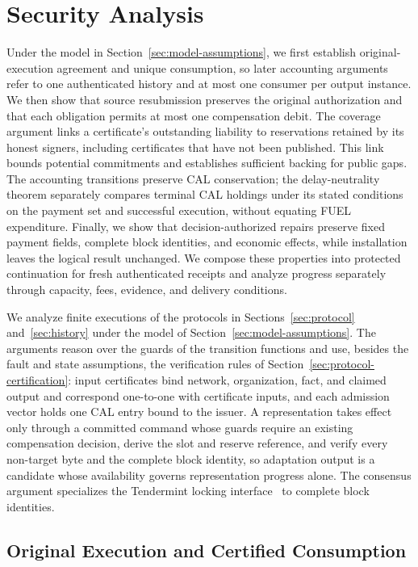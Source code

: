 \section{Security Analysis}
\label{sec:security}

Under the model in Section~\ref{sec:model-assumptions}, we first establish original-execution agreement and unique consumption, so later accounting arguments refer to one authenticated history and at most one consumer per output instance. We then show that source resubmission preserves the original authorization and that each obligation permits at most one compensation debit. The coverage argument links a certificate's outstanding liability to reservations retained by its honest signers, including certificates that have not been published. This link bounds potential commitments and establishes sufficient backing for public gaps. The accounting transitions preserve CAL conservation; the delay-neutrality theorem separately compares terminal CAL holdings under its stated conditions on the payment set and successful execution, without equating FUEL expenditure. Finally, we show that decision-authorized repairs preserve fixed payment fields, complete block identities, and economic effects, while installation leaves the logical result unchanged. We compose these properties into protected continuation for fresh authenticated receipts and analyze progress separately through capacity, fees, evidence, and delivery conditions.

We analyze finite executions of the protocols in Sections~\ref{sec:protocol} and~\ref{sec:history} under the model of Section~\ref{sec:model-assumptions}. The arguments reason over the guards of the transition functions and use, besides the fault and state assumptions, the verification rules of Section~\ref{sec:protocol-certification}: input certificates bind network, organization, fact, and claimed output and correspond one-to-one with certificate inputs, and each admission vector holds one CAL entry bound to the issuer. A representation takes effect only through a committed command whose guards require an existing compensation decision, derive the slot and reserve reference, and verify every non-target byte and the complete block identity, so adaptation output is a candidate whose availability governs representation progress alone. The consensus argument specializes the Tendermint locking interface~\cite{tendermint} to complete block identities.

\subsection{Original Execution and Certified Consumption}
\label{sec:security-identity}

